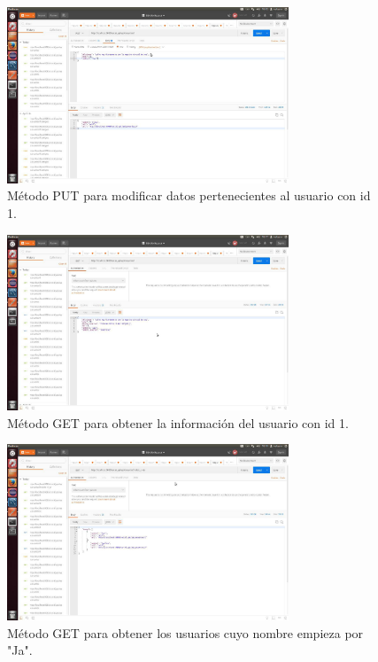 \documentclass[12pt,a4paper, spanish]{article}
\begin{document}
\begin{figure}[H]
	\centering
	\includegraphics[width=0.75\textwidth]{images/captura13.jpg}
	\caption{Método PUT para modificar datos pertenecientes al usuario con id 1.}
\end{figure}

\begin{figure}[H]
	\centering
	\includegraphics[width=0.75\textwidth]{images/captura14.jpg}
	\caption{Método GET para obtener la información del usuario con id 1.}
\end{figure}

\begin{figure}[H]
	\centering
	\includegraphics[width=0.75\textwidth]{images/captura15.jpg}
	\caption{Método GET para obtener los usuarios cuyo nombre empieza por "Ja".}
\end{figure}
\end{document}
